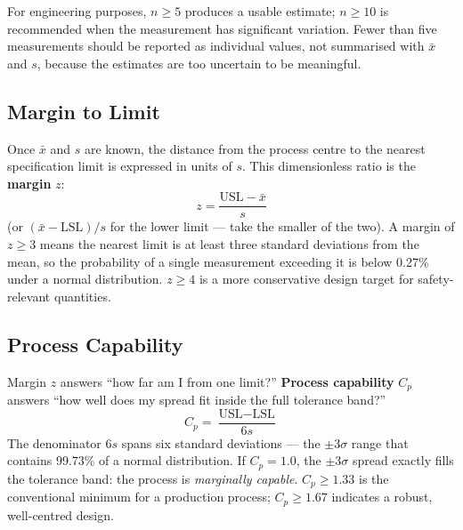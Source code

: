 For engineering purposes, $n \geq 5$ produces a usable estimate; $n \geq 10$ is
recommended when the measurement has significant variation.
Fewer than five measurements should be reported as individual values, not summarised with
$\bar{x}$ and $s$, because the estimates are too uncertain to be meaningful.

\subsection{Margin to Limit}
\label{subsec:ch14-margin}

Once $\bar{x}$ and $s$ are known, the
distance from the process centre to the nearest specification limit is expressed in units
of $s$.
This dimensionless ratio is the \textbf{margin} $z$:
\begin{equation}
  z = \frac{\text{USL} - \bar{x}}{s}
  \label{eq:ch14-margin}
\end{equation}
(or $({\bar{x} - \text{LSL}})/s$ for the lower limit --- take the smaller of the two).
A margin of $z \geq 3$ means the nearest limit is at least three standard deviations from
the mean, so the probability of a single measurement exceeding it is below 0.27\% under
a normal distribution.
$z \geq 4$ is a more conservative design target for safety-relevant quantities.

\subsection{Process Capability}
\label{subsec:ch14-capability}

Margin $z$ answers ``how far am I from one
limit?''
\textbf{Process capability} $C_p$ answers ``how well does my spread fit inside the full
tolerance band?''
\begin{equation}
  C_p = \frac{\text{USL} - \text{LSL}}{6s}
  \label{eq:ch14-cp}
\end{equation}
The denominator $6s$ spans six standard deviations --- the $\pm 3\sigma$ range that
contains 99.73\% of a normal distribution.
If $C_p = 1.0$, the $\pm 3\sigma$ spread exactly fills the tolerance band: the process is
\emph{marginally capable}.
$C_p \geq 1.33$ is the conventional minimum for a production process; $C_p \geq 1.67$
indicates a robust, well-centred design.

